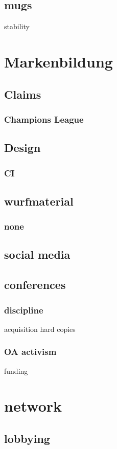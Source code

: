 \documentclass[output=guidelines,guidelines] {langscibook}
\begin{document}
\subsection{mugs}

stability 
\section{Markenbildung}
\subsection{Claims}
\subsubsection{Champions League}
\subsection{Design}
\subsubsection{CI}
\subsection{wurfmaterial}
\subsubsection{none}
\subsection{social media}
\subsection{conferences}
\subsubsection{discipline}
                    acquisition
                    hard copies
\subsubsection{OA activism}
                    funding
\section{network}
\subsection{lobbying}
\end{document}
